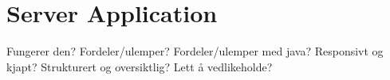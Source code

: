 \section{Server Application}
Fungerer den? Fordeler/ulemper? Fordeler/ulemper med java? Responsivt og kjapt? Strukturert og oversiktlig? Lett å vedlikeholde?